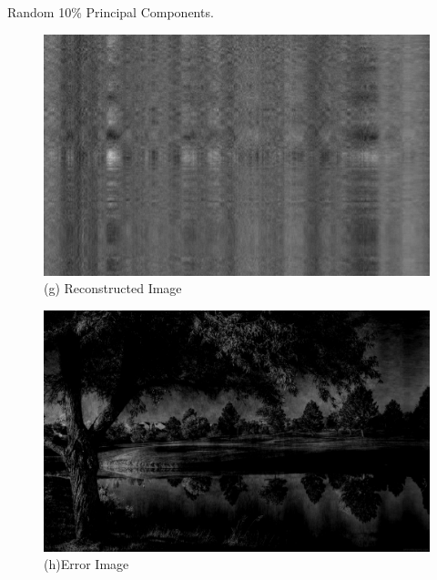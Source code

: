 \documentclass[a4 paper]{article}
\begin{document}
 Random 10\% Principal Components.\\
\begin{figure}[!htb]
    \centering
    \begin{minipage}{0.49\textwidth}
        \centering
        \includegraphics[width=1\textwidth]{Random10_R.png} \\
        (g) Reconstructed Image
    \end{minipage}\hfill
    \begin{minipage}{0.49\textwidth}
        \centering
        \includegraphics[width=1\textwidth]{Random10_E.png}\\
         (h)Error Image
    \end{minipage}
    \label{fig:l}
\end{figure}
\end{document}
